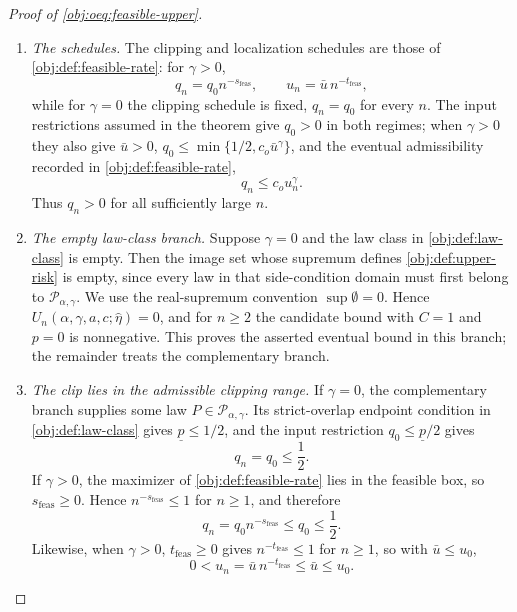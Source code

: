 \begin{proof}[Proof of \cref{obj:oeq:feasible-upper}]
\begin{enumerate}
\item \emph{The schedules.}  The clipping and localization schedules are those of \cref{obj:def:feasible-rate}: for \(\gamma>0\),
\[
q_n=q_0n^{-s_{\mathrm{feas}}},\qquad
u_n=\bar u\,n^{-t_{\mathrm{feas}}},
\]
while for \(\gamma=0\) the clipping schedule is fixed, \(q_n=q_0\) for every \(n\).  The input restrictions assumed in the theorem give \(q_0>0\) in both regimes; when \(\gamma>0\) they also give \(\bar u>0\), \(q_0\le\min\{1/2,c_o\bar u^\gamma\}\), and the eventual admissibility recorded in \cref{obj:def:feasible-rate},
\[
q_n\le c_o u_n^\gamma .
\]
Thus \(q_n>0\) for all sufficiently large \(n\). %

\item \emph{The empty law-class branch.}  Suppose \(\gamma=0\) and the law class in \cref{obj:def:law-class} is empty.  Then the image set whose supremum defines \cref{obj:def:upper-risk} is empty, since every law in that side-condition domain must first belong to \(\mathcal P_{\alpha,\gamma}\).  We use the real-supremum convention \(\sup\emptyset=0\).  Hence \(U_n(\alpha,\gamma,a,c;\widehat\eta)=0\), and for \(n\ge2\) the candidate bound with \(C=1\) and \(p=0\) is nonnegative.  This proves the asserted eventual bound in this branch; the remainder treats the complementary branch. %

\item \emph{The clip lies in the admissible clipping range.}  If \(\gamma=0\), the complementary branch supplies some law \(P\in\mathcal P_{\alpha,\gamma}\).  Its strict-overlap endpoint condition in \cref{obj:def:law-class} gives \(\underline p\le1/2\), and the input restriction \(q_0\le\underline p/2\) gives
\[
q_n=q_0\le\frac12 .
\]
If \(\gamma>0\), the maximizer of \cref{obj:def:feasible-rate} lies in the feasible box, so \(s_{\mathrm{feas}}\ge0\).  Hence \(n^{-s_{\mathrm{feas}}}\le1\) for \(n\ge1\), and therefore
\[
q_n=q_0n^{-s_{\mathrm{feas}}}\le q_0\le\frac12 .
\]
Likewise, when \(\gamma>0\), \(t_{\mathrm{feas}}\ge0\) gives \(n^{-t_{\mathrm{feas}}}\le1\) for \(n\ge1\), so with \(\bar u\le u_0\),
\[
0<u_n=\bar u\,n^{-t_{\mathrm{feas}}}\le\bar u\le u_0 .
\]


\end{enumerate}
\end{proof}
